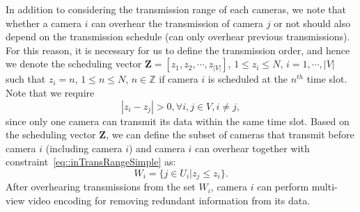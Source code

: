 In addition to considering the transmission range of each cameras, we note that whether a camera $i$ can overhear the transmission of camera $j$ or not should also depend on the transmission schedule (can only overhear previous transmissions).
For this reason, it is necessary for us to define the transmission order, and hence we denote the scheduling vector ${\mathbf{Z} = [z_1, z_2, \cdots, z_{|V|}]}$, ${1 \leq z_i \leq N}$, ${i=1,\cdots,|V|}$ such that ${z_i = n}$, ${1 \leq n \leq N}$, ${n \in \mathbb{Z}}$ if camera $i$ is scheduled at the $n^{th}$ time slot.
Note that we require
\begin{equation}
|z_i - z_j| > 0, \forall i,j \in V, i \neq j,
\label{eq::oneSlotOneCam}
\end{equation}
since only one camera can transmit its data within the same time slot.
Based on the scheduling vector $\mathbf{Z}$, we can define the subset of cameras that transmit before camera $i$ (including camera $i$) and camera $i$ can overhear together with constraint~\eqref{eq::inTransRangeSimple} as: 
\begin{equation}
W_i = \{ j \in U_i | z_j \leq z_i \}.
\label{eq::prevSet}
\end{equation}
After overhearing transmissions from the set $W_i$, camera $i$ can perform multi-view video encoding for removing redundant information from its data.

